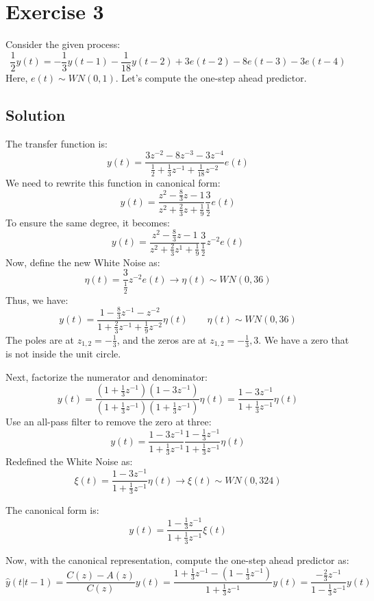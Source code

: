 \section{Exercise 3}

Consider the given process:
\[\dfrac{1}{2}y(t)=-\dfrac{1}{3}y(t-1)-\dfrac{1}{18}y(t-2)+3e(t-2)-8e(t-3)-3e(t-4)\]
Here, $e(t)\sim WN(0,1)$. 
Let's compute the one-step ahead predictor.

\subsection*{Solution}
The transfer function is:
\[y(t)=\dfrac{3z^{-2}-8z^{-3}-3z^{-4}}{\frac{1}{2}+\frac{1}{3}z^{-1}+\frac{1}{18}z^{-2}}e(t)\]
We need to rewrite this function in canonical form:
\[y(t)=\dfrac{z^{2}-\frac{8}{3}z-1}{z^2+\frac{2}{3}z+\frac{1}{9}}\frac{3}{\frac{1}{2}}e(t)\]
To ensure the same degree, it becomes:
\[y(t)=\dfrac{z^{2}-\frac{8}{3}z-1}{z^2+\frac{2}{3}z^1+\frac{1}{9}}\frac{3}{\frac{1}{2}}z^{-2}e(t)\]
Now, define the new  White Noise as:
\[\eta(t)=\frac{3}{\frac{1}{2}}z^{-2}e(t)\rightarrow \eta(t)\sim WN\left(0,36\right)\]
Thus, we have:
\[y(t)=\dfrac{1-\frac{8}{3}z^{-1}-z^{-2}}{1+\frac{2}{3}z^{-1}+\frac{1}{9}z^{-2}}\eta(t) \qquad \eta(t)\sim WN\left(0,36\right)\]
The poles are at $z_{1,2}=-\frac{1}{3}$, and the zeros are at $z_{1,2}=-\frac{1}{3},3$. 
We have a zero that is not inside the unit circle.

Next, factorize the numerator and denominator:
\[y(t)=\dfrac{\left(1+\frac{1}{3}z^{-1}\right)\left(1-3z^{-1}\right)}{\left(1+\frac{1}{3}z^{-1}\right)\left(1+\frac{1}{3}z^{-1}\right)}\eta(t)=\dfrac{1-3z^{-1}}{1+\frac{1}{3}z^{-1}}\eta(t) \]
Use an all-pass filter to remove the zero at three:
\[y(t)=\dfrac{1-3z^{-1}}{1+\frac{1}{3}z^{-1}}\dfrac{1-\frac{1}{3}z^{-1}}{1+\frac{1}{3}z^{-1}}\eta(t)\]
Redefined the  White Noise as:
\[\xi(t)=\dfrac{1-3z^{-1}}{1+\frac{1}{3}z^{-1}}\eta(t)\rightarrow \xi(t)\sim WN(0,324)\]

The canonical form is:
\[y(t)=\dfrac{1-\frac{1}{3}z^{-1}}{1+\frac{1}{3}z^{-1}}\xi(t)\]

Now, with the canonical representation, compute the one-step ahead predictor as:
\[\hat{y}(t|t-1)=\dfrac{C(z)-A(z)}{C(z)}y(t)=\dfrac{1+\frac{1}{3}z^{-1}-\left(1-\frac{1}{3}z^{-1}\right)}{1+\frac{1}{3}z^{-1}}y(t)=\dfrac{-\frac{2}{3}z^{-1}}{1-\frac{1}{3}z^{-1}}y(t)\]